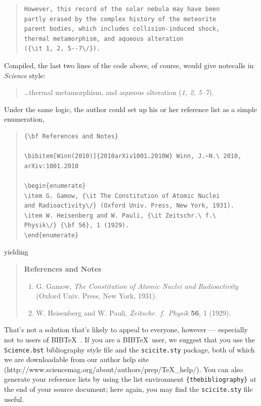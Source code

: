 \documentclass[12pt]{article}
\begin{document}
\begin{quote}
\begin{verbatim}
However, this record of the solar nebula may have been
partly erased by the complex history of the meteorite
parent bodies, which includes collision-induced shock,
thermal metamorphism, and aqueous alteration
({\it 1, 2, 5--7\/}).
\end{verbatim}
\end{quote}


\noindent Compiled, the last two lines of the code above, of course, would give notecalls in {\it Science\/} style:

\begin{quote}
\ldots thermal metamorphism, and aqueous alteration ({\it 1, 2, 5--7\/}).
\end{quote}

Under the same logic, the author could set up his or her reference list as a simple enumeration,

\begin{quote}
\begin{verbatim}
{\bf References and Notes}

\bibitem[Winn(2010)]{2010arXiv1001.2010W} Winn, J.~N.\ 2010, 
arXiv:1001.2010 

\begin{enumerate}
\item G. Gamow, {\it The Constitution of Atomic Nuclei
and Radioactivity\/} (Oxford Univ. Press, New York, 1931).
\item W. Heisenberg and W. Pauli, {\it Zeitschr.\ f.\ 
Physik\/} {\bf 56}, 1 (1929).
\end{enumerate}
\end{verbatim}
\end{quote}

\noindent yielding

\begin{quote}
{\bf References and Notes}

\begin{enumerate}
\item G. Gamow, {\it The Constitution of Atomic Nuclei and
Radioactivity\/} (Oxford Univ. Press, New York, 1931).
\item W. Heisenberg and W. Pauli, {\it Zeitschr.\ f.\ Physik} {\bf 56},
1 (1929).
\end{enumerate}
\end{quote}

That's not a solution that's likely to appeal to everyone, however ---
especially not to users of B{\small{IB}}\TeX\ \cite{inclme}.  If you
are a B{\small{IB}}\TeX\ user, we suggest that you use the
\texttt{Science.bst} bibliography style file and the
\texttt{scicite.sty} package, both of which we are downloadable from our author help site
(http://www.sciencemag.org/about/authors/prep/TeX_help/).  You can also
generate your reference lists by using the list environment
\texttt{\{thebibliography\}} at the end of your source document; here
again, you may find the \texttt{scicite.sty} file useful.
\end{document}
